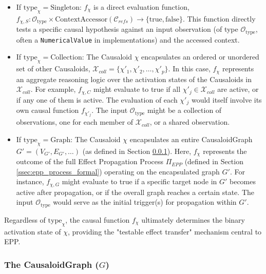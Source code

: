     \begin{itemize}
        \item If \( \text{type}_\chi = \text{Singleton} \):
            \(f_\chi\) is a direct evaluation function, \(f_{\chi,S}: \mathcal{O}_{\text{type}} \times \text{ContextAccessor}(\mathcal{C}_{refs}) \to \{\text{true}, \text{false}\}\). This function directly tests a specific causal hypothesis against an input observation (of type \(\mathcal{O}_{\text{type}}\), often a \texttt{NumericalValue} in implementations) and the accessed context. 

        \item If \( \text{type}_\chi = \text{Collection} \):
            The Causaloid \(\chi\) encapsulates an ordered or unordered set of other Causaloids, \(\mathcal{X}_{coll} = \{\chi'_1, \chi'_2, \dots, \chi'_p\}\). 
            In this case, \(f_\chi\) represents an aggregate reasoning logic over the activation states of the Causaloids in \(\mathcal{X}_{coll}\). For example, \(f_{\chi,C}\) might evaluate to true if all \(\chi'_j \in \mathcal{X}_{coll}\) are active, or if any one of them is active. The evaluation of each \(\chi'_j\) would itself involve its own causal function \(f_{\chi'_j}\). The input \(\mathcal{O}_{\text{type}}\) might be a collection of observations, one for each member of \(\mathcal{X}_{coll}\), or a shared observation.

        \item If \( \text{type}_\chi = \text{Graph} \):
            The Causaloid \(\chi\) encapsulates an entire CausaloidGraph \(G'=(V_{G'}, E_{G'}, \dots)\) (as defined in Section \ref{ssec:causaloidgraph_formal}). 
            Here, \(f_\chi\) represents the outcome of the full Effect Propagation Process \(\Pi_{EPP}\) (defined in Section \ref{ssec:epp_process_formal}) operating on the encapsulated graph \(G'\). For instance, \(f_{\chi,G}\) might evaluate to true if a specific target node in \(G'\) becomes active after propagation, or if the overall graph reaches a certain state. The input \(\mathcal{O}_{\text{type}}\) would serve as the initial trigger(s) for propagation within \(G'\).
    \end{itemize}
    Regardless of \(\text{type}_\chi\), the causal function \(f_\chi\) ultimately determines the binary activation state of \(\chi\), providing the "testable effect transfer" mechanism central to EPP.

    
    \subsubsection[The CausaloidGraph (\(G\))]{The CausaloidGraph (\(G\))}
    \label{ssec:causaloidgraph_formal} %

